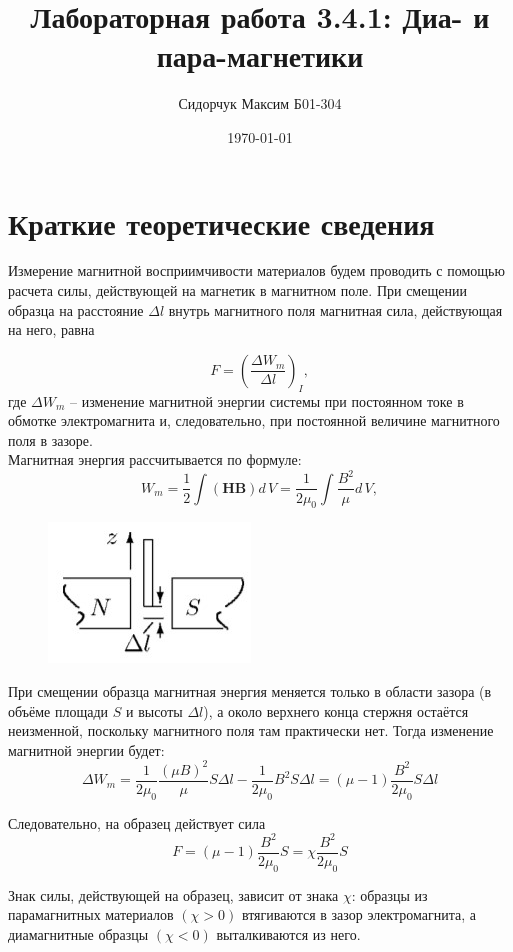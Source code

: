 \documentclass{lab}
\title {Лабораторная работа 3.4.1: Диа- и пара-магнетики}
\author {Сидорчук Максим Б01-304}
\date{\today}
\begin{document}
\maketitle

\section*{Краткие теоретические сведения}
Измерение магнитной восприимчивости материалов будем проводить с помощью расчета силы, действующей на магнетик в магнитном поле. При смещении образца на расстояние $ \Delta l $ внутрь магнитного поля магнитная сила, действующая на него, равна

\begin{equation}
    F = \left(\frac{\Delta W_m}{\Delta l}\right)_I,
\end{equation}
где $ \Delta W_m $ -- изменение магнитной энергии системы при постоянном токе
в обмотке электромагнита и, следовательно, при постоянной величине
магнитного поля в зазоре.\\
Магнитная энергия рассчитывается по формуле:
\[W_m=\frac{1}{2}\int (\mathbf{H}\mathbf{B})d\,V = \frac{1}{2\mu_0}\int\frac{B^2}{\mu}d\,V,\]
\begin{figure}
    \centering
    \includegraphics[height = 0.12\textheight]{energy.jpg}
\end{figure}

При смещении образца магнитная энергия меняется только в области зазора (в объёме площади $ S $ и высоты $ \Delta l $), а около верхнего конца стержня остаётся неизменной, поскольку магнитного поля там практически нет. Тогда изменение магнитной энергии будет:
\[\Delta W_m=\frac{1}{2\mu_0}\frac{(\mu B)^2}{\mu}S\Delta l - \frac{1}{2\mu_0}B^2 S\Delta l = (\mu - 1) \frac{B^2}{2\mu_0}S\Delta l \]

Следовательно, на образец действует сила
\[F = (\mu - 1)\frac{B^2}{2\mu_0}S = \chi\frac{B^2}{2\mu_0}S\]

Знак силы, действующей на образец, зависит от знака $ \chi $: образцы из парамагнитных материалов $( \chi  > 0)$ втягиваются в зазор электромагнита, а диамагнитные образцы $ (\chi < 0) $ выталкиваются из него.
\end{document}
